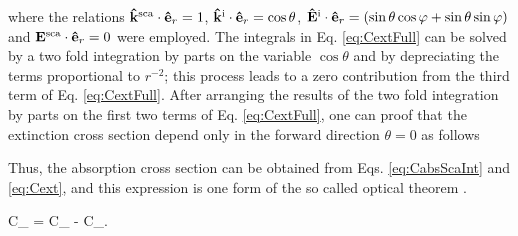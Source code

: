 %
where the relations $\vu{k}^\text{sca}\cdot\vu{e}_r = 1$, $\vu{k}^\text{i}\cdot\vu{e}_r = \cos\theta$, $\vu{E}^\text{i}\cdot\vu{e}_r= (\sin\theta\cos\varphi+\sin\theta\sin\varphi)$ and  $\vb{E}^\text{sca}\cdot\vu{e}_r = 0$ were employed. The integrals in Eq. \eqref{eq:CextFull} can be solved by a two fold integration by parts on the variable $\cos\theta$ and by depreciating the terms proportional to $r^{-2}$; this process leads to a zero contribution from the third term of Eq. \eqref{eq:CextFull}. After arranging the results of the two fold integration by parts on the first two terms of Eq. \eqref{eq:CextFull}, one can proof that the extinction cross section depend only in the forward direction $\theta = 0$ as follows \cite{bohren_absorption_1983}
%
%
Thus, the absorption cross section can be obtained from Eqs. \eqref{eq:CabsScaInt} and \eqref{eq:Cext}, and this expression is one form of the so called optical theorem \cite{newton_optical_1976,bohren_absorption_1983}.
%
%
\begin{tcolorbox}[title = Optical Theorem,	ams align, breakable]
		C_ = C_ - C_.
		\label{eq:OptTheorem}
\end{tcolorbox}














